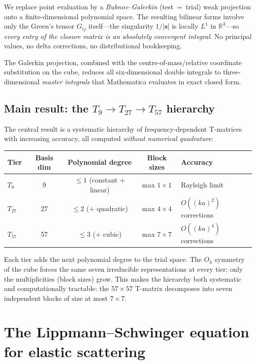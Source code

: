 \documentclass[11pt,a4paper]{article}
\newcommand{\bs}{\bm{s}}
\newcommand{\R}{\mathbb{R}}
\newcommand{\Oh}{O_h}
\theoremstyle{plain}
\theoremstyle{definition}
\theoremstyle{remark}
\begin{document}
We replace point evaluation by a \emph{Bubnov--Galerkin}
(test~=~trial) weak projection onto a finite-dimensional polynomial
space.  The resulting bilinear forms involve only the Green's tensor
$G_{ij}$ itself---the singularity $1/|\bs|$ is locally $L^1$ in
$\R^3$---so \emph{every entry of the closure matrix is an absolutely
convergent integral}.  No principal values, no delta corrections, no
distributional bookkeeping.

The Galerkin projection, combined with the centre-of-mass/relative
coordinate substitution on the cube, reduces all six-dimensional
double integrals to three-dimensional \emph{master integrals} that
Mathematica evaluates in exact closed form.

\subsection{Main result: the $T_9 \to T_{27} \to T_{57}$ hierarchy}

The central result is a systematic hierarchy of frequency-dependent
T-matrices with increasing accuracy, all computed \emph{without
numerical quadrature}:
\begin{center}
\renewcommand{\arraystretch}{1.3}
\begin{tabular}{lcccl}
\toprule
Tier & Basis dim & Polynomial degree & Block sizes & Accuracy \\
\midrule
$T_9$  & 9  & $\le 1$ (constant $+$ linear) & max $1\times 1$ & Rayleigh limit \\
$T_{27}$ & 27 & $\le 2$ ($+$ quadratic) & max $4\times 4$ & $O((ka)^2)$ corrections \\
$T_{57}$ & 57 & $\le 3$ ($+$ cubic) & max $7\times 7$ & $O((ka)^4)$ corrections \\
\bottomrule
\end{tabular}
\end{center}
Each tier adds the next polynomial degree to the trial space.  The
$\Oh$ symmetry of the cube forces the same seven irreducible
representations at every tier; only the multiplicities (block sizes)
grow.  This makes the hierarchy both systematic and computationally
tractable: the $57\times 57$ T-matrix decomposes into seven
independent blocks of size at most $7\times 7$.


\section{The Lippmann--Schwinger equation for elastic scattering}
\label{sec:lippmann-schwinger}
\end{document}
